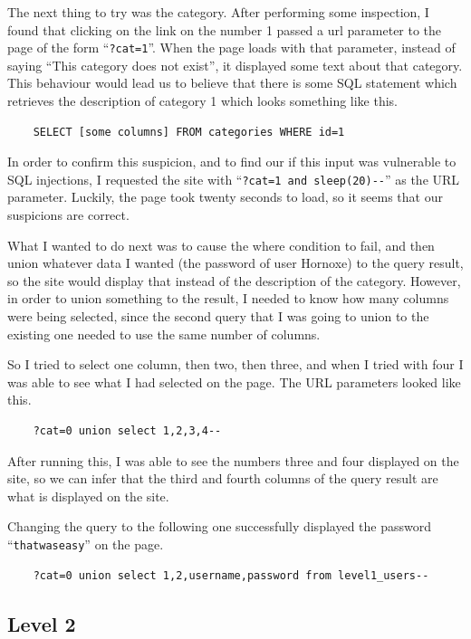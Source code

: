 \documentclass{article}
\begin{document}
The next thing to try was the category. After performing some inspection, I found that clicking on the link on the number 1 passed a url parameter to the page of the form ``\verb`?cat=1`''. When the page loads with that parameter, instead of saying ``This category does not exist'', it displayed some text about that category. This behaviour would lead us to believe that there is some SQL statement which retrieves the description of category 1 which looks something like this.

\begin{verbatim}
	SELECT [some columns] FROM categories WHERE id=1
\end{verbatim}

In order to confirm this suspicion, and to find our if this input was vulnerable to SQL injections, I requested the site with ``\verb`?cat=1 and sleep(20)--`'' as the URL parameter. Luckily, the page took twenty seconds to load, so it seems that our suspicions are correct.

What I wanted to do next was to cause the where condition to fail, and then union whatever data I wanted (the password of user Hornoxe) to the query result, so the site would display that instead of the description of the category. However, in order to union something to the result, I needed to know how many columns were being selected, since the second query that I was going to union to the existing one needed to use the same number of columns.

So I tried to select one column, then two, then three, and when I tried with four I was able to see what I had selected on the page. The URL parameters looked like this.

\begin{verbatim}
	?cat=0 union select 1,2,3,4--
\end{verbatim}

After running this, I was able to see the numbers three and four displayed on the site, so we can infer that the third and fourth columns of the query result are what is displayed on the site.

Changing the query to the following one successfully displayed the password ``\verb`thatwaseasy`'' on the page.

\begin{verbatim}
	?cat=0 union select 1,2,username,password from level1_users--
\end{verbatim}

\subsection{Level 2}
\end{document}
